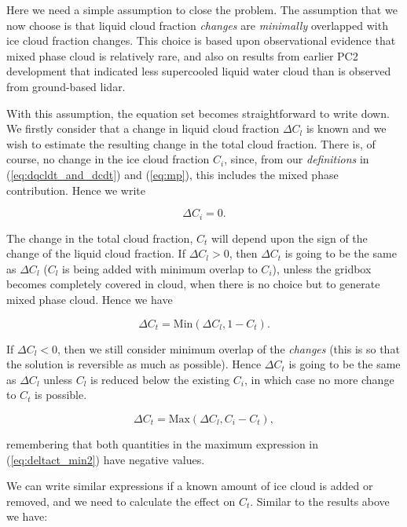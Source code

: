\documentclass{UMDP_article}
\begin{document}
Here we
need a simple assumption to close the problem. The assumption
that we now choose is that liquid cloud fraction \textit{changes} are
\textit{minimally} overlapped with ice cloud fraction changes.
This choice is based upon observational evidence that mixed
phase cloud is relatively rare, and also on results from earlier PC2
development that indicated less supercooled liquid water cloud than
is observed from ground-based lidar.

With this assumption, the equation set becomes straightforward to
write down. We firstly consider that a change in liquid cloud fraction
$\Delta C_l$ is known and we wish to estimate the resulting change in
the total cloud fraction. There is, of course, no change in the ice
cloud fraction $C_i$, since, from our \textit{definitions} in
(\ref{eq:dqcldt_and_dcdt}) and (\ref{eq:mp}), this includes the mixed phase
contribution. Hence we write

\begin{equation}
\Delta C_i = 0 .
\label{eq:deltaci_eq_0}
\end{equation}

The change in the total cloud fraction, $C_t$ will depend upon
the sign of the change of the liquid cloud fraction. If 
$\Delta C_l > 0$, then $\Delta C_t$ is going to be the same as $\Delta C_l$
($C_l$ is being added with minimum overlap to $C_i$), unless the
gridbox becomes completely covered in cloud, when there is no
choice but to generate mixed phase cloud. Hence we have

\begin{equation}
\Delta C_t = \text{Min} ( \Delta C_l , 1 - C_t ).
\label{eq:deltact_min}
\end{equation}

If $\Delta C_l < 0$, then we still consider minimum overlap
of the \textit{changes} (this is so that the solution is reversible as
much as possible). Hence $\Delta C_t$ is going to be the same as
$\Delta C_l$ unless $C_l$ is reduced below the existing $C_i$, in
which case no more change to $C_t$ is possible.

\begin{equation}
\Delta C_t = \text{Max} ( \Delta C_l , C_i - C_t ) ,
\label{eq:deltact_min2}
\end{equation}

remembering that both quantities in the maximum expression in
(\ref{eq:deltact_min2}) have negative values.

We can write similar expressions if a known amount of ice cloud
is added or removed, and we need to calculate the effect on $C_t$.
Similar to the results above we have:
\end{document}
